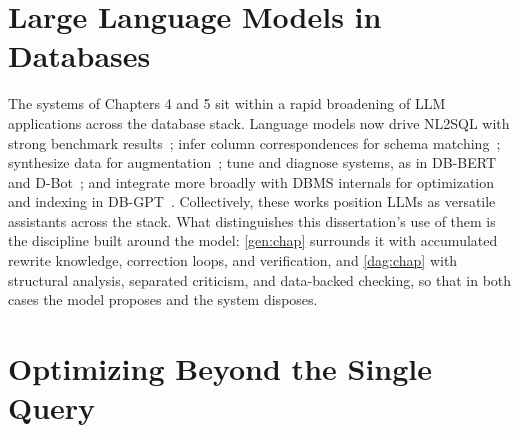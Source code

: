 \section{Large Language Models in Databases}
\label{sec:related:llms}

The systems of Chapters 4 and 5 sit within a rapid broadening of LLM
applications across the database stack. Language models now drive
NL2SQL with strong benchmark results~\cite{li2023can}; infer column
correspondences for schema matching~\cite{parciak2407schema};
synthesize data for augmentation~\cite{tian2025text}; tune and
diagnose systems, as in DB-BERT and
D-Bot~\cite{trummer2022db,zhou2023d}; and integrate more broadly with
DBMS internals for optimization and indexing in
DB-GPT~\cite{zhou2023dbgpt}. Collectively, these works position LLMs
as versatile assistants across the stack. What distinguishes this
dissertation's use of them is the discipline built around the model:
\cref{gen:chap} surrounds it with accumulated rewrite knowledge,
correction loops, and verification, and \cref{dag:chap} with
structural analysis, separated criticism, and data-backed checking, so
that in both cases the model proposes and the system disposes.

\section{Optimizing Beyond the Single Query}
\label{sec:related:pipelines}
\label{dag:sec:related}

